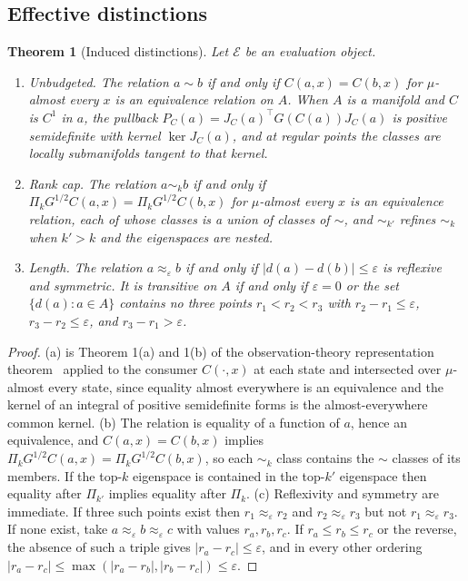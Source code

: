 \documentclass[11pt]{article}
\newtheorem{theorem}{Theorem}
\theoremstyle{definition}
\theoremstyle{remark}
\newcommand{\Ev}{\mathcal{E}}
\newcommand{\PC}{P_{C}}
\begin{document}
\subsection{Effective distinctions}

\begin{theorem}[Induced distinctions]
\label{thm:dist}
Let $\Ev$ be an evaluation object.
\begin{enumerate}
\item[(a)] \emph{Unbudgeted.} The relation $a\sim b$ if and only if $C(a,x)=C(b,x)$ for $\mu$-almost every $x$ is an equivalence relation on $A$. When $A$ is a manifold and $C$ is $C^{1}$ in $a$, the pullback $\PC(a)=J_{C}(a)^{\top}G(C(a))J_{C}(a)$ is positive semidefinite with kernel $\ker J_{C}(a)$, and at regular points the classes are locally submanifolds tangent to that kernel.
\item[(b)] \emph{Rank cap.} The relation $a\sim_{k}b$ if and only if $\Pi_{k}G^{1/2}C(a,x)=\Pi_{k}G^{1/2}C(b,x)$ for $\mu$-almost every $x$ is an equivalence relation, each of whose classes is a union of classes of $\sim$, and $\sim_{k'}$ refines $\sim_{k}$ when $k'>k$ and the eigenspaces are nested.
\item[(c)] \emph{Length.} The relation $a\approx_{\varepsilon}b$ if and only if $|d(a)-d(b)|\le\varepsilon$ is reflexive and symmetric. It is transitive on $A$ if and only if $\varepsilon=0$ or the set $\{d(a):a\in A\}$ contains no three points $r_{1}<r_{2}<r_{3}$ with $r_{2}-r_{1}\le\varepsilon$, $r_{3}-r_{2}\le\varepsilon$, and $r_{3}-r_{1}>\varepsilon$.
\end{enumerate}
\end{theorem}

\begin{proof}
(a) is Theorem 1(a) and 1(b) of the observation-theory representation theorem~\cite{bond2026or} applied to the consumer $C(\cdot,x)$ at each state and intersected over $\mu$-almost every state, since equality almost everywhere is an equivalence and the kernel of an integral of positive semidefinite forms is the almost-everywhere common kernel.
(b) The relation is equality of a function of $a$, hence an equivalence, and $C(a,x)=C(b,x)$ implies $\Pi_{k}G^{1/2}C(a,x)=\Pi_{k}G^{1/2}C(b,x)$, so each $\sim_{k}$ class contains the $\sim$ classes of its members. If the top-$k$ eigenspace is contained in the top-$k'$ eigenspace then equality after $\Pi_{k'}$ implies equality after $\Pi_{k}$.
(c) Reflexivity and symmetry are immediate. If three such points exist then $r_{1}\approx_{\varepsilon}r_{2}$ and $r_{2}\approx_{\varepsilon}r_{3}$ but not $r_{1}\approx_{\varepsilon}r_{3}$. If none exist, take $a\approx_{\varepsilon}b\approx_{\varepsilon}c$ with values $r_{a},r_{b},r_{c}$. If $r_{a}\le r_{b}\le r_{c}$ or the reverse, the absence of such a triple gives $|r_{a}-r_{c}|\le\varepsilon$, and in every other ordering $|r_{a}-r_{c}|\le\max(|r_{a}-r_{b}|,|r_{b}-r_{c}|)\le\varepsilon$.
\end{proof}
\end{document}

